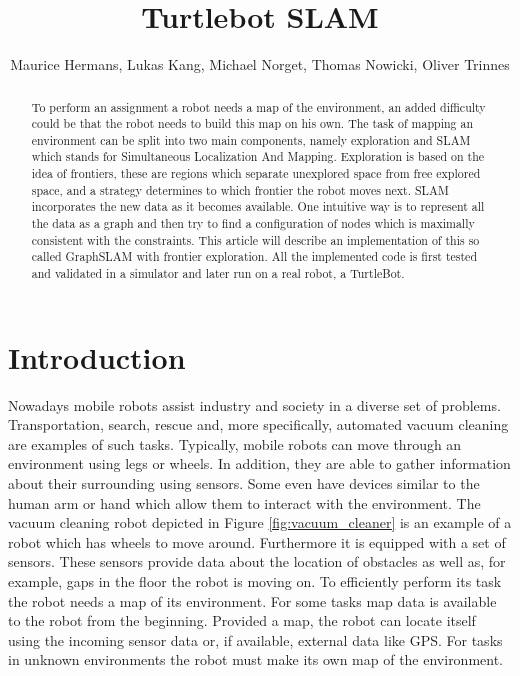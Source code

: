 \documentclass{ba-kecs}
\title{Turtlebot SLAM }
\author{Maurice Hermans, Lukas Kang, Michael Norget, Thomas Nowicki, Oliver Trinnes}
\begin{document}
\maketitle

\begin{abstract}
To perform an assignment a robot needs a map of the environment, an added difficulty could be that the robot needs to build this map on his own. The task of mapping an environment can be split into two main components, namely exploration and SLAM which stands for Simultaneous Localization And Mapping. Exploration is based on the idea of frontiers, these are regions which separate unexplored space from free explored space, and a strategy determines to which frontier the robot moves next. SLAM incorporates the new data as it becomes available. One intuitive way is to represent all the data as a graph and then try to find a configuration of nodes which is maximally consistent with the constraints. This article will describe an implementation of this so called GraphSLAM with frontier exploration. All the implemented code is first tested and validated in a simulator and later run on a real robot, a TurtleBot.
\end{abstract}

\section{Introduction}
\label{sec:intro}
Nowadays mobile robots assist industry and society in a diverse set of problems. Transportation, search, rescue and, more specifically, automated vacuum cleaning are examples of such tasks. Typically, mobile robots can move through an environment using legs or wheels. In addition, they are able to gather information about their surrounding using sensors. Some even have devices similar to the human arm or hand which allow them to interact with the environment. The vacuum cleaning robot depicted in Figure \ref{fig:vacuum_cleaner} is an example of a robot which has wheels to move around. Furthermore it is equipped with a set of sensors. These sensors provide data about the location of obstacles as well as, for example, gaps in the floor the robot is moving on. To efficiently perform its task the robot needs a map of its environment. For some tasks map data is available to the robot from the beginning. Provided a map, the robot can locate itself using the incoming sensor data or, if available, external data like GPS. For tasks in unknown environments the robot must make its own map of the environment.
\end{document}
